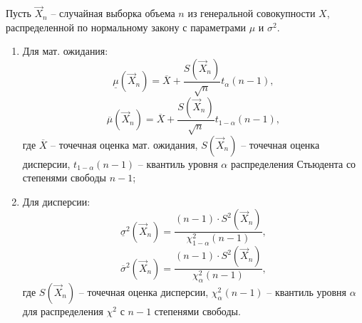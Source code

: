 Пусть $\vec X_n$ -- случайная выборка объема $n$ из генеральной совокупности $X$, распределенной по нормальному закону с параметрами $\mu$ и $\sigma^2$.
\begin{enumerate}
	\item Для мат. ожидания:
	\begin{equation}
		\displaystyle \underline \mu(\vec X_n) = \overline X + \frac{S(\vec X_n)}{\sqrt{n}} t_{\alpha} (n - 1),
	\end{equation}
	\begin{equation}
		\displaystyle \overline \mu(\vec X_n) = \overline X + \frac{S(\vec X_n)}{\sqrt{n}} t_{1 - \alpha} (n - 1),
	\end{equation}
	где $\overline X$ -- точечная оценка мат. ожидания, $S(\vec X_n)$ -- точечная оценка дисперсии, $t_{1 - \alpha} (n - 1)$ -- квантиль уровня $\alpha$ распределения Стьюдента со степенями свободы $n - 1$;\newpage
	\item Для дисперсии:
	\begin{equation}
		\displaystyle \underline \sigma^2(\vec X_n) = \frac{(n - 1) \cdot S^2(\vec X_n)}{\chi_{1 - \alpha}^2 (n - 1)},
	\end{equation}
	\begin{equation}
		\displaystyle \overline \sigma^2(\vec X_n) = \frac{(n - 1) \cdot S^2(\vec X_n)}{\chi_{\alpha}^2 (n - 1)},
	\end{equation}
	где $S(\vec X_n)$ -- точечная оценка дисперсии, $\chi_{\alpha}^2 (n - 1)$ -- квантиль уровня $\alpha$ для распределения $\chi^2$ с $n - 1$ степенями свободы.
\end{enumerate}

